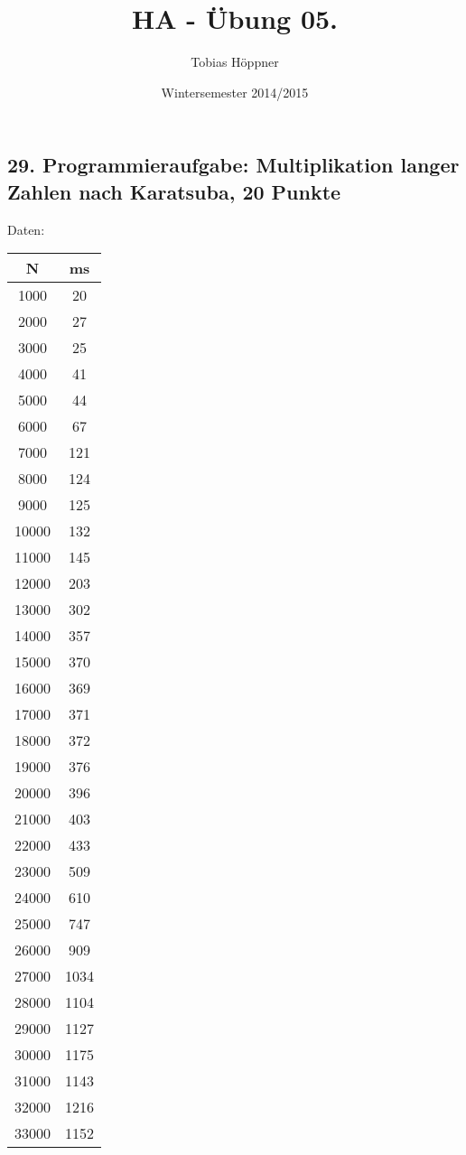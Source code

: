 \documentclass[ngerman,a4paper]{report}
\author{Tobias Höppner}
\title{HA - Übung 05.}
\date{Wintersemester 2014/2015}
\renewcommand{\maketitle}{}
\begin{document}
 
\maketitle 

\subsection*{29. Programmieraufgabe: Multiplikation langer Zahlen nach Karatsuba, 20 Punkte}
Daten:
\begin{tabular}{|c|c|}
\hline
N & ms\\
\hline
1000 & 20\\
\hline
2000 & 27\\
\hline
3000 & 25\\
\hline
4000 & 41\\
\hline
5000 & 44\\
\hline
6000 & 67\\
\hline
7000 & 121\\
\hline
8000 & 124\\
\hline
9000 & 125\\
\hline
10000 & 132\\
\hline
11000 & 145\\
\hline
12000 & 203\\
\hline
13000 & 302\\
\hline
14000 & 357\\
\hline
15000 & 370\\
\hline
16000 & 369\\
\hline
17000 & 371\\
\hline
18000 & 372\\
\hline
19000 & 376\\
\hline
20000 & 396\\
\hline
21000 & 403\\
\hline
22000 & 433\\
\hline
23000 & 509\\
\hline
24000 & 610\\
\hline
25000 & 747\\
\hline
26000 & 909\\
\hline
27000 & 1034\\
\hline
28000 & 1104\\
\hline
29000 & 1127\\
\hline
30000 & 1175\\
\hline
31000 & 1143\\
\hline
32000 & 1216\\
\hline
33000 & 1152\\
\hline

\end{tabular}
\end{document}
